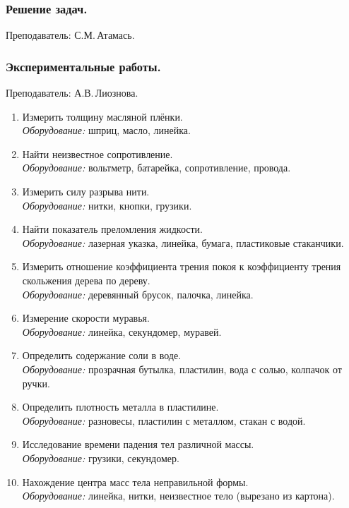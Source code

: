 \documentclass[12pt,a4paper,oneside,draft]{scrartcl}
\newcounter{notask}
\newlength{\h}
\newlength{\x}
\begin{document}
\subsubsection{Решение задач.}
\label{sec:daily_9_problems}

\textsf{Преподаватель: С.М.\,Атамась.}
\smallskip
\parindent=0mm








\setcounter{notask}{1}
\parindent=5mm

\subsubsection{Экспериментальные работы.}
\label{sec:daily_9_exp}

\textsf{Преподаватель: А.В.\,Лиознова.}

\begin{enumerate}
\item Измерить толщину масляной плёнки. \\ \textit{Оборудование:} шприц, масло, линейка.
\item Найти неизвестное сопротивление. \\ \textit{Оборудование:} вольтметр, батарейка, сопротивление, провода.
\item Измерить силу разрыва нити. \\ \textit{Оборудование:} нитки, кнопки, грузики.
\item Найти показатель преломления жидкости. \\ \textit{Оборудование:} лазерная указка, линейка, бумага, пластиковые стаканчики.
\item Измерить отношение коэффициента трения покоя к коэффициенту
  трения скольжения дерева по дереву. \\ \textit{Оборудование:} деревянный брусок, палочка, линейка.
\item Измерение скорости муравья.  \\ \textit{Оборудование:} линейка,
  секундомер, муравей.
\item Определить содержание соли в воде. \\ \textit{Оборудование:}
  прозрачная бутылка, пластилин, вода с солью, колпачок от ручки.
\item Определить плотность металла в пластилине. \\
  \textit{Оборудование:} разновесы, пластилин с металлом, стакан с
  водой.
\item Исследование времени падения тел различной массы. \\
  \textit{Оборудование:} грузики, секундомер.
\item Нахождение центра масс тела неправильной формы. \\
  \textit{Оборудование:} линейка, нитки, неизвестное тело (вырезано из
  картона).
\end{enumerate}
\end{document}
